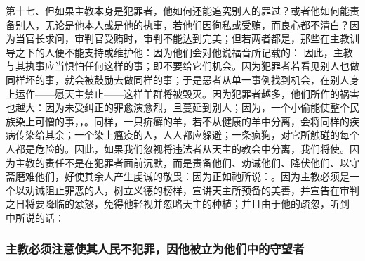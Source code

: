 第十七、但如果主教本身是犯罪者，他如何还能追究别人的罪过？或者他如何能责备别人，无论是他本人或是他的执事，若他们因徇私或受贿，而良心都不清白？因为当官长求问，审判官受贿时，审判不能达到完美；但若两者都是，那些在主教训导之下的人便不能支持或维护他：因为他们会对他说福音所记载的： 因此，主教与其执事应当惧怕任何这样的事；即不要给它们机会。因为犯罪者若看见别人也做同样坏的事，就会被鼓励去做同样的事；于是恶者从单一事例找到机会，在别人身上运作——愿天主禁止——这样羊群将被毁灭。因为犯罪者越多，他们所作的祸害也越大：因为未受纠正的罪愈演愈烈，且蔓延到别人；因为，一个小偷能使整个民族染上可憎的事，，。同样，一只疥癣的羊，若不从健康的羊中分离，会将同样的疾病传染给其余；一个染上瘟疫的人，人人都应躲避；一条疯狗，对它所触碰的每个人都是危险的。因此，如果我们忽视将违法者从天主的教会中分离，我们将使。因为主教的责任不是在犯罪者面前沉默，而是责备他们、劝诫他们、降伏他们、以守斋磨难他们，好使其余人产生虔诚的敬畏：因为正如祂所说：。因为主教必须是一个以劝诫阻止罪恶的人，树立义德的榜样，宣讲天主所预备的美善，并宣告在审判之日将要降临的忿怒，免得他轻视并忽略天主的种植；并且由于他的疏忽，听到  中所说的话：\par


\subsubsection{主教必须注意使其人民不犯罪，因他被立为他们中的守望者}

